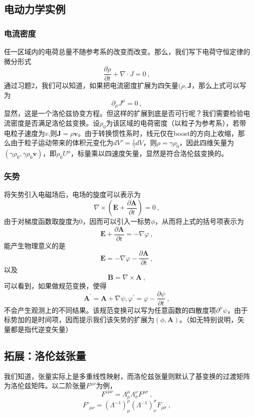 \subsection{电动力学实例}
\subsubsection{电流密度}
任一区域内的电荷总量不随参考系的改变而改变。那么，我们写下电荷守恒定律的微分形式
\begin{equation}
\frac{\partial\rho}{\partial t}+\nabla \cdot J=0~,
\end{equation}
通过习题2，我们可以知道，如果把电流密度扩展为四矢量$(\rho,\boldsymbol{ J}$，那么上式可以写为
\begin{equation}
\partial_\mu J^\mu=0~,
\end{equation}
显然，这是一个洛伦兹协变方程。但这样的扩展到底是否可行呢？我们需要检验电流密度是否满足洛伦兹变换。设$\rho_0$为该区域的电荷密度（以粒子为参考系），若带电粒子速度为$v$,则$\boldsymbol{ J}=\rho \boldsymbol{ v}$。由于转换惯性系时，线元仅在boost的方向上收缩，那么由于粒子运动带来的体积元变化为$dV'=\frac{1}{\gamma}dV$，则$\rho=\gamma\rho_0$，因此四维矢量为$(\gamma\rho_0,\gamma\rho_0\boldsymbol{v})$，即$\rho_0U^\mu$，标量乘以四速度矢量，显然是符合洛伦兹变换的。
\subsubsection{矢势}
将矢势引入电磁场后，电场的旋度可以表示为
\begin{equation}
\nabla \times\left(\boldsymbol{E}+\frac{\partial \boldsymbol{A}}{\partial t}\right)=0~,
\end{equation}
由于对梯度函数取旋度为0，因而可以引入一标势$\phi$，从而将上式的括号项表示为
\begin{equation}
\boldsymbol{E}+\frac{\partial \boldsymbol{A}}{\partial t}=-\nabla \varphi~,
\end{equation}
能产生物理意义的是
\begin{equation}
\boldsymbol{E}=-\nabla \varphi-\frac{\partial \boldsymbol{A}}{\partial t}~,
\end{equation}以及
\begin{equation}
\boldsymbol{B}=\nabla \times \boldsymbol{A}~,
\end{equation}
可以看到，如果做规范变换，使得
\begin{equation}
\boldsymbol{A}^{\prime}=\boldsymbol{A}+\nabla \psi, 
\varphi^{\prime}=\varphi-\frac{\partial \psi}{\partial t}~,
\end{equation}
不会产生观测上的不同结果。该规范变换可以写为任意函数的四散度项$\partial^\mu \psi$，由于标势加的是时间项，因而提示我们该矢势的扩展为$(\phi,\boldsymbol A)$。（如无特别说明，矢量都是指代逆变矢量）
\subsection{拓展：洛伦兹张量}
我们知道，张量实际上是多重线性映射，而洛伦兹张量则默认了基变换的过渡矩阵为洛伦兹矩阵。以二阶张量$F^{\mu\nu} $为例，
\begin{equation}
F'^{\mu\nu}=\Lambda_\rho^\mu \Lambda_\sigma^\nu F^{\rho\sigma}  ~,
\end{equation}
\begin{equation}
F'_{\mu\nu}=(\Lambda^{-1})_\mu^\rho (\Lambda^{-1})_\nu^\sigma F_{\rho\sigma}~,
\end{equation}


